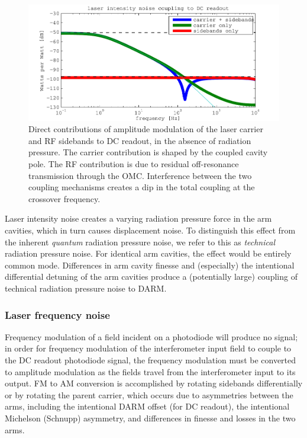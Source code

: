 \begin{figure}
\includegraphics[width=\columnwidth]{notes/figures/srcam_contributions.pdf}
\caption[Components of laser intensity noise contribution to DC readout]{\label{fig:laser-AM-contributions}Direct contributions of
  amplitude modulation of the laser carrier and RF sidebands to DC
  readout, in the absence of radiation pressure.  The carrier
  contribution is shaped by the coupled cavity pole.  The RF
  contribution is due to residual off-resonance transmission through
  the OMC.  Interference between the two coupling mechanisms creates a
  dip in the total coupling at the crossover frequency.}
\end{figure}

Laser intensity noise creates a varying radiation pressure force in the arm
cavities, which in turn causes displacement noise.  To distinguish this effect
from the inherent \emph{quantum} radiation pressure
noise\cite{Caves1980QuantumMechanical}, we refer to this as \emph{technical}
radiation pressure noise.  For identical arm cavities, the effect would be
entirely common mode.  Differences in arm cavity finesse and (especially) the
intentional differential detuning of the arm cavities produce a (potentially
large\cite{ChaibiOptomechanical}) coupling of technical radiation pressure noise
to DARM.

\subsubsection{Laser frequency noise}

Frequency modulation of a field incident on a photodiode will produce
no signal; in order for frequency modulation of the interferometer
input field to couple to the DC readout photodiode signal, the
frequency modulation must be converted to amplitude modulation as the
fields travel from the interferometer input to its output.  FM to AM
conversion is accomplished by rotating sidebands differentially or by
rotating the parent carrier, which occurs due to asymmetries between
the arms, including the intentional DARM offset (for DC readout), the
intentional Michelson (Schnupp) asymmetry, and differences in finesse
and losses in the two arms.

